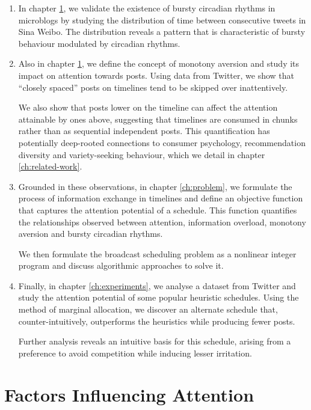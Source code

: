 \documentclass[onecolumn, 12 pt, doublespace, fullpage, letterpaper]{report}
\begin{document}
\begin{enumerate}
       \item In chapter \ref{ch:factors}, we validate the existence of bursty circadian rhythms in microblogs by studying the distribution of time between consecutive tweets in Sina Weibo. The distribution reveals a pattern that is characteristic of bursty behaviour modulated by circadian rhythms.

       \item Also in chapter \ref{ch:factors}, we define the concept of monotony aversion and study its impact on attention towards posts. Using data from Twitter, we show that ``closely spaced'' posts on timelines tend to be skipped over inattentively.

       We also show that posts lower on the timeline can affect the attention attainable by ones above, suggesting that timelines are consumed in chunks rather than as sequential independent posts. This quantification has potentially deep-rooted connections to consumer psychology, recommendation diversity and variety-seeking behaviour, which we detail in chapter \ref{ch:related-work}.

       \item Grounded in these observations, in chapter \ref{ch:problem}, we formulate the process of information exchange in timelines and define an objective function that captures the attention potential of a schedule. This function quantifies the relationships observed between attention, information overload, monotony aversion and bursty circadian rhythms.

       We then formulate the broadcast scheduling problem as a nonlinear integer program and discuss algorithmic approaches to solve it.

       \item Finally, in chapter \ref{ch:experiments}, we analyse a dataset from Twitter and study the attention potential of some popular heuristic schedules. Using the method of marginal allocation, we discover an alternate schedule that, counter-intuitively, outperforms the heuristics while producing fewer posts.

       Further analysis reveals an intuitive basis for this schedule, arising from a preference to avoid competition while inducing lesser irritation.
\end{enumerate}

\chapter{Factors Influencing Attention}
\label{ch:factors}
\end{document}
